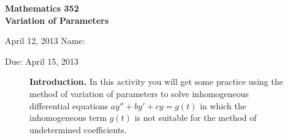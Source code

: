 \documentclass[answers,11pt]{exam}
\begin{document}
\noindent
\textbf{{\large Mathematics 352 \\ Variation of Parameters}}

\noindent
April 12, 2013 \hfill Name: \underline{\hspace{3in}} 

\noindent
Due: April 15, 2013

\noindent
\begin{figure}[h]
\centering
\begin{minipage}[b]{0.85\linewidth}
\textbf{Introduction.} In this activity you will get some practice using the method of variation of parameters to solve inhomogeneous differential equations $ay'' + by' + cy = g(t)$ in which the inhomogeneous term $g(t)$ is not suitable for the method of undetermined coefficients.
\end{minipage}
\end{figure}
\end{document}
